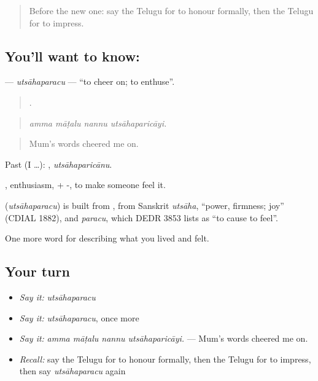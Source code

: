 \label{lesson:TE-C501-utsahaparacu}



\begin{quote}
Before the new one: say the Telugu for to honour formally, then the Telugu for to impress.
\end{quote}

\subsection*{You'll want to know: }
\textbf{} — \emph{utsāhaparacu} — \textquotedblleft{}to cheer on; to enthuse\textquotedblright{}.

\begin{quote}
   .
\end{quote}

\begin{quote}
\emph{amma māṭalu nannu utsāhaparicāyi.}
\end{quote}

\begin{quote}
Mum's words cheered me on.
\end{quote}

Past (I …): , \emph{utsāhaparicānu}.

, enthusiasm, + -, to make someone feel it.

\begin{cousinweb}
\textbf{} (\emph{utsāhaparacu}) is built from , from Sanskrit \emph{utsāha}, \textquotedblleft{}power, firmness; joy\textquotedblright{} (CDIAL 1882), and \emph{paracu}, which DEDR 3853 lists as \textquotedblleft{}to cause to feel\textquotedblright{}.
\end{cousinweb}

\begin{grammarlens}[title={What you've built}]
One more word for describing what you lived and felt.
\end{grammarlens}

\subsection*{Your turn}
\begin{itemize}
\raggedright
  \item \emph{Say it:} \emph{utsāhaparacu}
  \item \emph{Say it:} \emph{utsāhaparacu}, once more
  \item \emph{Say it:} \emph{amma māṭalu nannu utsāhaparicāyi.} — Mum's words cheered me on.
  \item \emph{Recall:} say the Telugu for to honour formally, then the Telugu for to impress, then say \emph{utsāhaparacu} again
\end{itemize}

